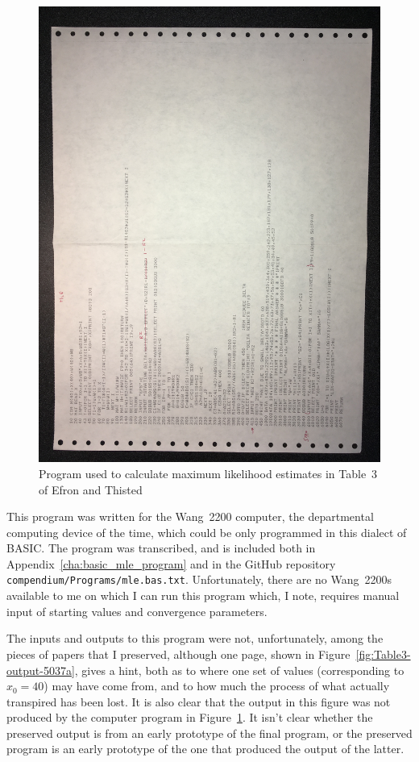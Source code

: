\begin{figure}
	\centering
	\includegraphics[width=5in,angle=180]{Photos/mle-bas-5036.jpg}
	\caption{Program used to calculate maximum likelihood estimates in Table~3 of Efron and Thisted \citeyear{Efron:1976zs} }
	\label{fig:mle-bas-orig}
\end{figure}

This program was written for the Wang~2200 computer, the departmental computing device of the time, which could be only programmed in this dialect of BASIC.  The program was transcribed, and is included both in Appendix~\ref{cha:basic_mle_program} and in the GitHub repository \texttt{compendium/Programs/mle.bas.txt}.  Unfortunately, there are no Wang~2200s available to me on which I can run this program which, I note, requires manual input of starting values and convergence parameters.

The inputs and outputs to this program were not, unfortunately, among the pieces of papers that I preserved, although one page, shown in Figure~\ref{fig:Table3-output-5037a}, gives a hint, both as to where one set of values (corresponding to $x_0=40$) may have come from, and to how much the process of what actually transpired has been lost.  It is also clear that the output in this figure was not produced by the computer program in Figure~\ref{fig:mle-bas-orig}.  It isn't clear whether the preserved output is from an early prototype of the final program, or the preserved program is an early prototype of the one that produced the output of the latter.

